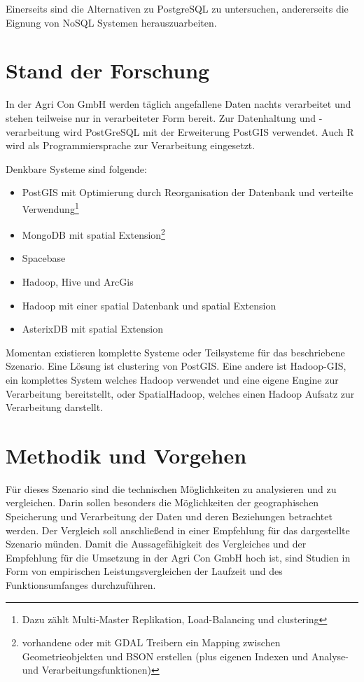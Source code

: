 \documentclass[
a4paper,     %
12pt         %
]{scrartcl}  %
\begin{document}
Einerseits sind die Alternativen zu PostgreSQL zu untersuchen, andererseits die Eignung von NoSQL Systemen herauszuarbeiten.


\section{Stand der Forschung}

In der Agri Con GmbH werden täglich angefallene Daten nachts verarbeitet und stehen teilweise nur in verarbeiteter Form bereit.
Zur Datenhaltung und -verarbeitung wird PostGreSQL mit der Erweiterung PostGIS verwendet. Auch R wird als Programmiersprache zur Verarbeitung eingesetzt.

Denkbare Systeme sind folgende:
\begin{itemize}
\item PostGIS mit Optimierung durch Reorganisation der Datenbank und verteilte Verwendung\footnote{Dazu zählt Multi-Master Replikation, Load-Balancing und clustering}
\item MongoDB mit spatial Extension\footnote{vorhandene oder mit GDAL Treibern ein Mapping zwischen Geometrieobjekten und BSON erstellen (plus eigenen Indexen und Analyse- und Verarbeitungsfunktionen)}
\item Spacebase
\item Hadoop, Hive und ArcGis
\item Hadoop mit einer spatial Datenbank und spatial Extension
\item AsterixDB mit spatial Extension
\end{itemize}


Momentan existieren komplette Systeme oder Teilsysteme für das beschriebene Szenario.
Eine Lösung ist clustering von PostGIS.
Eine andere ist Hadoop-GIS, ein komplettes System welches Hadoop verwendet und eine eigene Engine zur Verarbeitung bereitstellt, oder SpatialHadoop, welches einen Hadoop Aufsatz zur Verarbeitung darstellt.

\section{Methodik und Vorgehen}

Für dieses Szenario sind die technischen Möglichkeiten zu analysieren und zu vergleichen.
Darin sollen besonders die Möglichkeiten der geographischen Speicherung und Verarbeitung der Daten und deren Beziehungen betrachtet werden.
Der Vergleich soll anschließend in einer Empfehlung für das dargestellte Szenario münden.
Damit die Aussagefähigkeit des Vergleiches und der Empfehlung für die Umsetzung in der Agri Con GmbH hoch ist, sind Studien in Form von empirischen Leistungsvergleichen der Laufzeit und des Funktionsumfanges durchzuführen.
\end{document}
